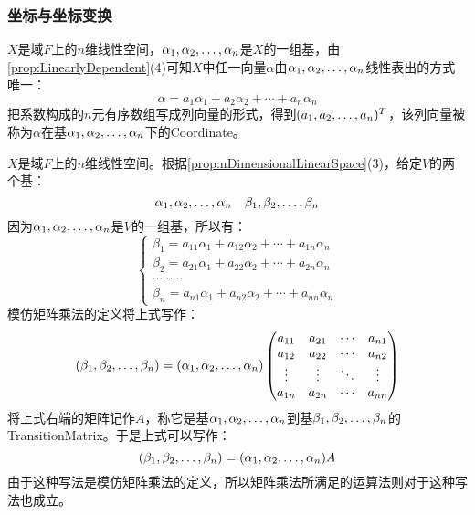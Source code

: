 \subsubsection{坐标与坐标变换}
\begin{definition}
	$X$是域$F$上的$n$维线性空间，$\alpha_1, \alpha_2, \dots, \alpha_{n}$是$X$的一组基，由\cref{prop:LinearlyDependent}(4)可知$X$中任一向量$\alpha$由$\alpha_1, \alpha_2, \dots, \alpha_{n}$线性表出的方式唯一：
	\begin{equation*}
		\alpha=a_1\alpha_1+a_2\alpha_2+\cdots+a_n\alpha_n
	\end{equation*}
	把系数构成的$n$元有序数组写成列向量的形式，得到$(a_1, a_2, \dots, a_{n})^T$，该列向量被称为$\alpha$在基$\alpha_1, \alpha_2, \dots, \alpha_{n}$下的\gls{Coordinate}。
\end{definition}
\begin{definition}
	$X$是域$F$上的$n$维线性空间。根据\cref{prop:nDimensionalLinearSpace}(3)，给定$V$的两个基：
	\begin{equation*}
		\alpha_1, \alpha_2, \dots, \alpha_{n}\quad\beta_1, \beta_2, \dots, \beta_{n}
	\end{equation*}
	因为$\alpha_1, \alpha_2, \dots, \alpha_{n}$是$V$的一组基，所以有：
	\begin{equation*}
		\begin{cases}
			\beta_1=a_{11}\alpha_1+a_{12}\alpha_2+\cdots+a_{1n}\alpha_n \\
			\beta_2=a_{21}\alpha_1+a_{22}\alpha_2+\cdots+a_{2n}\alpha_n \\
			\cdots\cdots\cdots \\
			\beta_n=a_{n1}\alpha_1+a_{n2}\alpha_2+\cdots+a_{nn}\alpha_n
		\end{cases}
	\end{equation*}
	模仿矩阵乘法的定义将上式写作：
	\begin{equation*}
		(\beta_1, \beta_2, \dots, \beta_{n})=(\alpha_1, \alpha_2, \dots, \alpha_{n})
		\begin{pmatrix}
			a_{11} & a_{21} & \cdots & a_{n1} \\
			a_{12} & a_{22} & \cdots & a_{n2} \\
			\vdots & \vdots & \ddots & \vdots \\
			a_{1n} & a_{2n} & \cdots & a_{nn}
		\end{pmatrix}
	\end{equation*}
	将上式右端的矩阵记作$A$，称它是基$\alpha_1, \alpha_2, \dots, \alpha_{n}$到基$\beta_1, \beta_2, \dots, \beta_{n}$的\gls{TransitionMatrix}。于是上式可以写作：
	\begin{equation*}
		(\beta_1, \beta_2, \dots, \beta_{n})=(\alpha_1, \alpha_2, \dots, \alpha_{n})A
	\end{equation*}
	由于这种写法是模仿矩阵乘法的定义，所以矩阵乘法所满足的运算法则对于这种写法也成立。
\end{definition}
